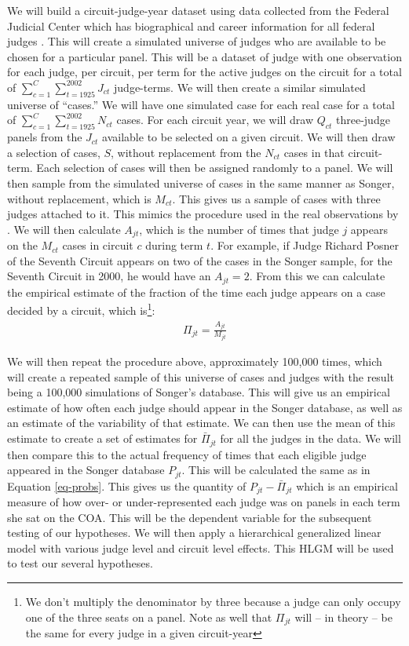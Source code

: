 \documentclass[12pt]{article}
\begin{document}
We will build a circuit-judge-year dataset using data collected from the Federal Judicial Center which has biographical and career information for all federal judges \citep{FJC}.  This will create a simulated universe of judges who are available to be chosen for a particular panel.  This will be a dataset of judge  with one observation for each judge, per circuit, per term for the active judges on the circuit for a total of $\sum_{c=1}^{C}\sum_{t=1925}^{2002}J_{ct}$ judge-terms.  We will then create a similar simulated universe of ``cases.''  We will have one simulated case for each real case for a total of $\sum_{c=1}^{C}\sum_{t=1925}^{2002}N_{ct}$ cases.  For each circuit year, we will draw $Q_{ct}$ three-judge panels from the $J_{ct}$ available to be selected on a given circuit.  We will then draw a selection of cases, $S$, without replacement from the $N_{ct}$ cases in that circuit-term.  Each selection of cases will then be assigned randomly to a panel.  We will then sample from the simulated universe of cases in the same manner as Songer, without replacement, which is $M_{ct}$.  This gives us a sample of cases with three judges attached to it.  This mimics the procedure used in the real observations by \citet{Songer2007}.  We will then calculate $A_{jt}$, which is the number of times that judge $j$ appears on the $M_{ct}$ cases in circuit $c$ during term $t$.  For example, if Judge Richard Posner of the Seventh Circuit appears on two of the cases in the Songer sample, for the Seventh Circuit in 2000, he would have an $A_{jt}=2$.  From this we can calculate the empirical estimate of the fraction of the time each judge appears on a case decided by a circuit, which is\footnote{We don't multiply the denominator by three because a judge can only occupy one of the three seats on a panel. Note as well that $\Pi_{jt}$ will -- in theory -- be the same for every judge in a given circuit-year}:
\begin{align}\label{eq-probs}
\Pi_{jt}=\frac{A_{jt}}{M_{jt}}
\end{align}

We will then repeat the procedure above, approximately 100,000 times, which will create a repeated sample of this universe of cases and judges with the result being a 100,000 simulations of Songer's database.  This will give us an empirical estimate of how often each judge should appear in the Songer database, as well as an estimate of the variability of that estimate.  We can then use the mean of this estimate to create a set of estimates for $\bar{\Pi}_{jt}$ for all the judges in the data.  We will then compare this to the actual frequency of times that each eligible judge appeared in the Songer database $P_{jt}$.  This will be calculated the same as in Equation \ref{eq-probs}.  This gives us the quantity of $P_{jt}-\bar{\Pi}_{jt}$ which is an empirical measure of how over- or under-represented each judge was on panels in each term she sat on the COA.  This will be the dependent variable for the subsequent testing of our hypotheses.  We will then apply a hierarchical generalized linear model with various judge level and circuit level effects.  This HLGM will be used to test our several hypotheses.
\end{document}
